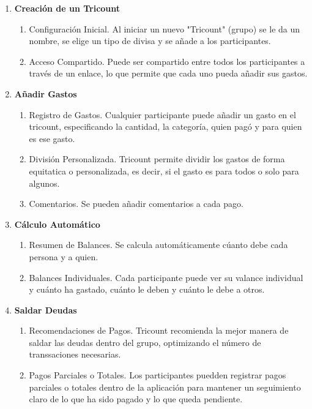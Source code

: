 \documentclass{article}
\begin{document}
\begin{enumerate}
    \item \textbf{Creación de un Tricount}
    \begin{enumerate}
        \item Configuración Inicial. Al iniciar un nuevo "Tricount" (grupo) se le da un nombre, se elige un tipo de divisa y se añade a los participantes.
        \item Acceso Compartido. Puede ser compartido entre todos los participantes a través de un enlace, lo que permite que cada uno pueda añadir sus gastos.
    \end{enumerate}
    \item \textbf{Añadir Gastos}
    \begin{enumerate}
        \item Registro de Gastos. Cualquier participante puede añadir un gasto en el tricount, especificando la cantidad, la categoría,
        quien pagó y para quien es ese gasto.
        \item División Personalizada. Tricount permite dividir los gastos de forma equitatica o personalizada, es decir, si el gasto es para todos o solo para algunos. 
        \item Comentarios. Se pueden añadir comentarios a cada pago.
    \end{enumerate}
    \item \textbf{Cálculo Automático}
    \begin{enumerate}
        \item Resumen de Balances. Se calcula automáticamente cúanto debe cada persona y a quien. 
        \item Balances Individuales. Cada participante puede ver su valance individual y cuánto ha gastado, cuánto le deben y cuánto le debe a otros.
    \end{enumerate}
    \item \textbf{Saldar Deudas}
    \begin{enumerate}
        \item Recomendaciones de Pagos. Tricount recomienda la mejor manera de saldar las deudas dentro del grupo, optimizando el número de 
        transsaciones necesarias.
        \item Pagos Parciales o Totales. Los participantes puedden registrar pagos parciales o totales dentro de la aplicación para mantener un
        seguimiento claro de lo que ha sido pagado y lo que queda pendiente.
    \end{enumerate}
\end{enumerate}
\end{document}
